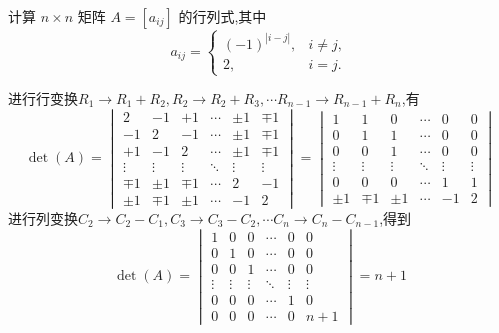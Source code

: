 \begin{questions}
    \question 计算 $n \times n$ 矩阵 $A = [a_{ij}]$ 的行列式,其中
    \[
    a_{ij} = 
    \begin{cases} 
    (-1)^{|i-j|}, & i \neq j, \\
    2, &  i = j.
    \end{cases}
    \]
    \begin{solution}
        进行行变换$R_1 \to R_1 + R_2,R_2 \to R_2 + R_3,\cdots R_{n-1} \to R_{n-1} + R_n$,有
        \[
        \det(A)=
        \begin{vmatrix}
        2 & -1 & +1 & \cdots & \pm1 & \mp1 \\
        -1 & 2 & -1 & \cdots & \pm1 & \mp1 \\
        +1 & -1 & 2 & \cdots & \pm1 & \mp1 \\
        \vdots & \vdots & \vdots & \ddots & \vdots & \vdots \\
        \mp1 & \pm1 & \mp1 & \cdots & 2 & -1 \\
        \pm1 & \mp1 & \pm1 & \cdots & -1 & 2
        \end{vmatrix}
        =
        \begin{vmatrix}
        1 & 1 & 0 &  \cdots & 0 & 0 \\
        0 & 1 & 1 &  \cdots & 0 & 0 \\
        0 & 0 & 1 &  \cdots & 0 & 0 \\
        \vdots & \vdots & \vdots & \ddots & \vdots & \vdots \\
        0 & 0 & 0 &  \cdots & 1 & 1 \\
        \pm1 & \mp1 & \pm1 & \cdots & -1 & 2
        \end{vmatrix}
        \]
        进行列变换$C_2 \to C_2 - C_1,C_3 \to C_3 - C_2, \cdots C_n \to C_n - C_{n-1}$,得到
        \[
        \det(A)=
        \begin{vmatrix}
        1 & 0 & 0 & \cdots & 0 & 0 \\
        0 & 1 & 0 & \cdots & 0 & 0 \\
        0 & 0 & 1 & \cdots & 0 & 0 \\
        \vdots & \vdots & \vdots & \ddots & \vdots & \vdots \\
        0 & 0 & 0 & \cdots & 1 & 0 \\
        0 & 0 & 0 & \cdots & 0 & n+1
        \end{vmatrix}
        = n+1
        \]
    \end{solution}


\end{questions}
